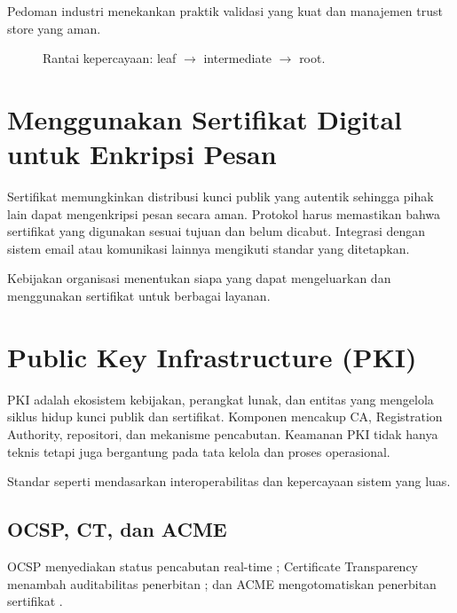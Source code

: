 \documentclass[../main.tex]{subfiles}
\begin{document}
Pedoman industri menekankan praktik validasi yang kuat dan manajemen trust store yang aman.

\begin{figure}[h]
\centering
{}
\caption{Rantai kepercayaan: leaf \(\to\) intermediate \(\to\) root.}
\label{fig:trust-chain}
\end{figure}

\section{Menggunakan Sertifikat Digital untuk Enkripsi Pesan}
Sertifikat memungkinkan distribusi kunci publik yang autentik sehingga pihak lain dapat mengenkripsi pesan secara aman. Protokol harus memastikan bahwa sertifikat yang digunakan sesuai tujuan dan belum dicabut. Integrasi dengan sistem email atau komunikasi lainnya mengikuti standar yang ditetapkan.

Kebijakan organisasi menentukan siapa yang dapat mengeluarkan dan menggunakan sertifikat untuk berbagai layanan.

\section{Public Key Infrastructure (PKI)}
PKI adalah ekosistem kebijakan, perangkat lunak, dan entitas yang mengelola siklus hidup kunci publik dan sertifikat. Komponen mencakup CA, Registration Authority, repositori, dan mekanisme pencabutan. Keamanan PKI tidak hanya teknis tetapi juga bergantung pada tata kelola dan proses operasional.

Standar seperti \textcite{rfc5280} mendasarkan interoperabilitas dan kepercayaan sistem yang luas.

\subsection{OCSP, CT, dan ACME}
OCSP menyediakan status pencabutan real-time \parencite{rfc6960}; Certificate Transparency menambah auditabilitas penerbitan \parencite{rfc6962}; dan ACME mengotomatiskan penerbitan sertifikat \parencite{rfc8555}.
\end{document}
